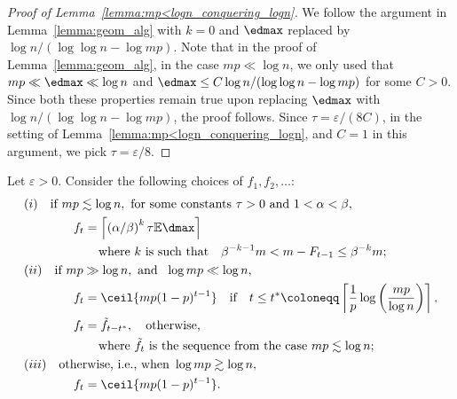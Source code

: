 \begin{proof}[Proof of Lemma~\ref{lemma:mp<logn_conquering_logn}]
We follow the argument in Lemma~\ref{lemma:geom_alg} with \(k = 0\) and \(\edmax\) replaced by \(\log n / (\log \log n - \log mp)\). Note that in the proof of Lemma~\ref{lemma:geom_alg}, in the case \(mp \ll \log n\), we only used that \(mp \ll \edmax \ll \log n\) and \(\edmax \leq C \log n / (\log \log n - \log mp)\) for some \(C > 0\). Since both these properties remain true upon replacing \(\edmax\) with \(\log n / (\log \log n - \log mp)\), the proof follows. Since \(\tau = \varepsilon / (8C)\), in the setting of Lemma~\ref{lemma:mp<logn_conquering_logn}, and \(C = 1\) in this argument, we pick \(\tau = \varepsilon / 8\).
\end{proof}
\begin{lemma}
    \label{lemma:find_one_col_lb}
        Let $\varepsilon > 0$. Consider the following choices of \(f_1, f_2, \ldots\):
        \begin{equation*}
            \begin{aligned}
                &(i) \quad  \text{if } mp \lesssim \log n, \text{ for some constants } \tau > 0 \text{ and } 1 < \alpha < \beta, \\
                &\qquad \qquad f_t = \left\lceil\left(\alpha / \beta \right)^k \tau\mathbb{E}\dmax\right\rceil \\
                &\qquad \qquad \qquad \text{where } k \text{ is such that} \quad \beta^{-k-1}m < m - F_{t-1} \leq \beta^{-k}m; \\
                &(ii) \quad  \text{if } mp \gg \log n, \  \text{and }\ \log mp \ll \log n, \\
                &\qquad \qquad f_t =  \ceil{mp(1-p)^{t-1}} \quad \text{if} \quad t \leq t^* \coloneqq \left\lceil \frac{1}{p}\log  \left(\frac{mp}{\log n}\right)\right \rceil,\\
                &\qquad \qquad f_t = \tilde{f}_{t - t^*}, \quad \text{otherwise,} \\
                &\qquad \qquad \qquad \text{where } \tilde{f}_t \text{ is the sequence from the case } mp \lesssim \log n; \\
                &(iii) \quad  \text{otherwise, i.e., when } \log mp \gtrsim \log n, \\
                &\qquad \qquad f_t = \ceil{mp(1-p)^{t - 1}}.
            \end{aligned}
        \end{equation*}
    

\end{lemma}
